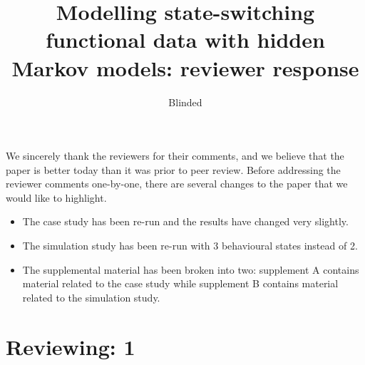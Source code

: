 \documentclass{article}
\begin{document}
\title{Modelling state-switching functional data with hidden Markov models: reviewer response}
\date{}
\author{Blinded}

\maketitle

We sincerely thank the reviewers for their comments, and we believe that the paper is better today than it was prior to peer review. Before addressing the reviewer comments one-by-one, there are several changes to the paper that we would like to highlight.

\begin{itemize}
    \item The case study has been re-run and the results have changed very slightly.
    \item The simulation study has been re-run with 3 behavioural states instead of 2.
    \item The supplemental material has been broken into two: supplement A contains material related to the case study while supplement B contains material related to the simulation study. 
\end{itemize}


\section{Reviewing: 1}
\end{document}
